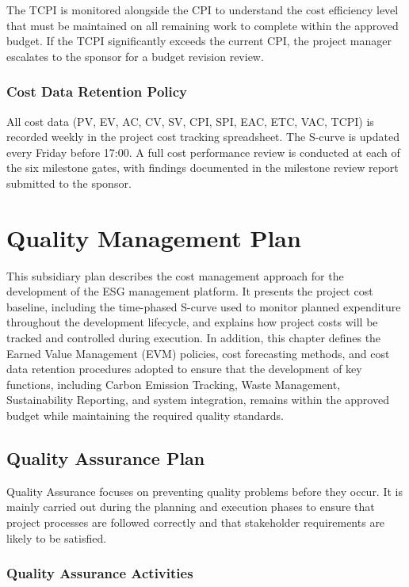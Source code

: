 \documentclass[12pt,a4paper]{article}
\begin{document}
The TCPI is monitored alongside the CPI to understand the cost efficiency level that must be maintained on all remaining work to complete within the approved budget. If the TCPI significantly exceeds the current CPI, the project manager escalates to the sponsor for a budget revision review.
\subsubsection{Cost Data Retention Policy}
All cost data (PV, EV, AC, CV, SV, CPI, SPI, EAC, ETC, VAC, TCPI) is recorded weekly in the project cost tracking spreadsheet. The S-curve is updated every Friday before 17:00. A full cost performance review is conducted at each of the six milestone gates, with findings documented in the milestone review report submitted to the sponsor.


\clearpage
\section{ Quality Management Plan}
This subsidiary plan describes the cost management approach for the development of the  ESG management platform. It presents the project cost baseline, including the time-phased S-curve used to monitor planned expenditure throughout the development lifecycle, and explains how project costs will be tracked and controlled during execution. In addition, this chapter defines the Earned Value Management (EVM) policies, cost forecasting methods, and cost data retention procedures adopted to ensure that the development of key functions, including Carbon Emission Tracking, Waste Management, Sustainability Reporting, and system integration, remains within the approved budget while maintaining the required quality standards.

\subsection{Quality Assurance Plan}
Quality Assurance focuses on preventing quality problems before they occur. It is mainly carried out during the planning and execution phases to ensure that project processes are followed correctly and that stakeholder requirements are likely to be satisfied.
\subsubsection{Quality Assurance Activities}
\end{document}
